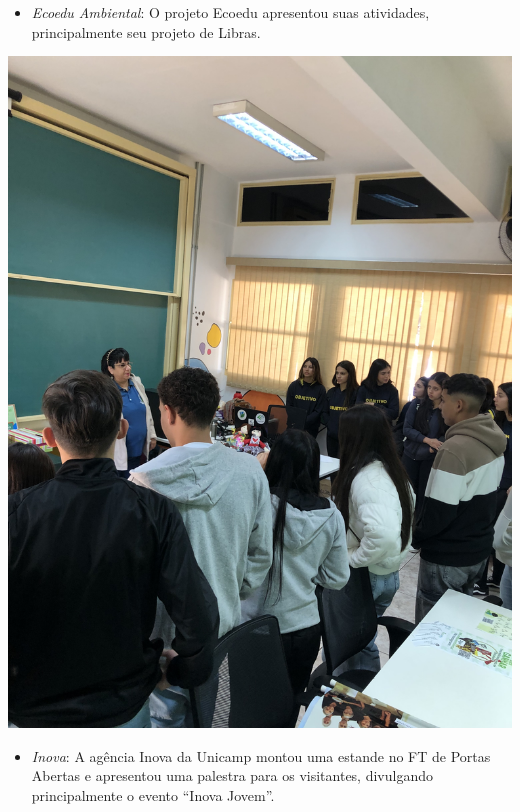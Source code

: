 \documentclass[
  letterpaper,
  DIV=11,
  numbers=noendperiod]{scrreprt}
\providecommand{\tightlist}{%
  \setlength{\itemsep}{0pt}\setlength{\parskip}{0pt}}\usepackage{longtable,booktabs,array}
\begin{document}
\begin{itemize}
\tightlist
\item
  \emph{Ecoedu Ambiental}: O projeto Ecoedu apresentou suas atividades,
  principalmente seu projeto de Libras.
\end{itemize}

\includegraphics[width=0.7\linewidth,height=\textheight,keepaspectratio]{planejamento/visita-ecoedu.jpg}

\begin{itemize}
\tightlist
\item
  \emph{Inova}: A agência Inova da Unicamp montou uma estande no FT de
  Portas Abertas e apresentou uma palestra para os visitantes,
  divulgando principalmente o evento ``Inova Jovem''.
\end{itemize}
\end{document}
